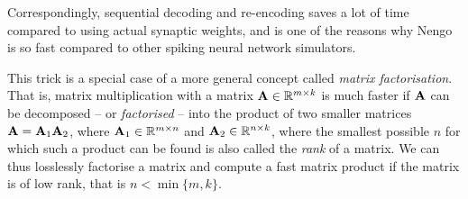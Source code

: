 \documentclass[10pt,letterpaper,oneside]{article}
\begin{document}
{	Correspondingly, sequential decoding and re-encoding saves a lot of time compared to using actual synaptic weights, and is one of the reasons why Nengo is so fast compared to other spiking neural network simulators.

	This trick is a special case of a more general concept called \emph{matrix factorisation}. That is, matrix multiplication with a matrix ${\mathbf{A}} \in \mathbb{R}^{m \times k}$ is much faster if ${\mathbf{A}}$ can be decomposed -- or \emph{factorised} -- into the product of two smaller matrices ${\mathbf{A}} = {\mathbf{A}}_1 {\mathbf{A}}_2$, where ${\mathbf{A}}_1 \in \mathbb{R}^{m \times n}$ and ${\mathbf{A}}_2 \in \mathbb{R}^{n \times k}$, where the smallest possible $n$ for which such a product can be found is also called the \emph{rank} of a matrix. We can thus losslessly factorise a matrix and compute a fast matrix product if the matrix is of low rank, that is $n < \min \{m, k\}$.

	
	}
\end{document}
